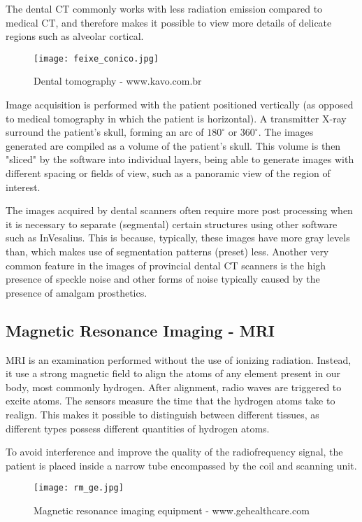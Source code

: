 The dental CT commonly works with less radiation emission compared to medical CT, and therefore makes it possible to view more details of delicate regions such as alveolar cortical.

\begin{figure}[!htb]
\centering
\texttt{[image: feixe\_conico.jpg]}
\caption{Dental tomography - www.kavo.com.br}
\end{figure}

Image acquisition is performed with the patient positioned vertically (as opposed to medical tomography in which the patient is horizontal). A transmitter X-ray surround the patient's skull, forming an arc of $180^\circ$ or $360^\circ$. The images generated are compiled as a volume of the patient's skull. This volume is then "sliced" by the software into individual layers, being able to generate images with different spacing or fields of view, such as a panoramic view of the region of interest.

The images acquired by dental scanners often require more post processing when it is necessary to separate (segmental) certain structures using other software such as InVesalius. This is because, typically, these images have more gray levels than, which makes use of segmentation patterns (preset) less. Another very common feature in the images of provincial dental CT scanners is the high presence of speckle noise and other forms of noise typically caused by the presence of amalgam prosthetics.

\subsection{Magnetic Resonance Imaging - MRI}

MRI is an examination performed without the use of ionizing radiation. Instead, it use a strong magnetic field to align the atoms of any element present in our body, most commonly hydrogen. After alignment, radio waves are triggered to excite atoms. The sensors measure the time that the hydrogen atoms take to realign. This makes it possible to distinguish between different tissues, as different types possess different quantities of hydrogen atoms.

To avoid interference and improve the quality of the radiofrequency signal, the patient is placed inside a narrow tube encompassed by the coil and scanning unit.

\begin{figure}[!htb]
\centering
\texttt{[image: rm\_ge.jpg]}
\caption{Magnetic resonance imaging equipment - www.gehealthcare.com}
\end{figure}

